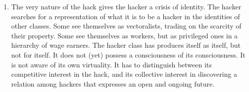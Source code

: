 \documentclass[letterpaper,12pt,english]{sphinxmanual}
\begin{document}
\begin{enumerate}
\item {} 
The very nature of the hack gives the hacker a crisis of identity. The hacker searches for a representation of what it is to be a hacker in the identities of other classes. Some see themselves as vectoralists, trading on the scarcity of their property. Some see themselves as workers, but as privileged ones in a hierarchy of wage earners. The hacker class has produces itself as itself, but not for itself. It does not (yet) possess a consciousness of its consciousness. It is not aware of its own virtuality. It has to distinguish between its competitive interest in the hack, and its collective interest in discovering a relation among hackers that expresses an open and ongoing future.

\end{enumerate}
\end{document}
